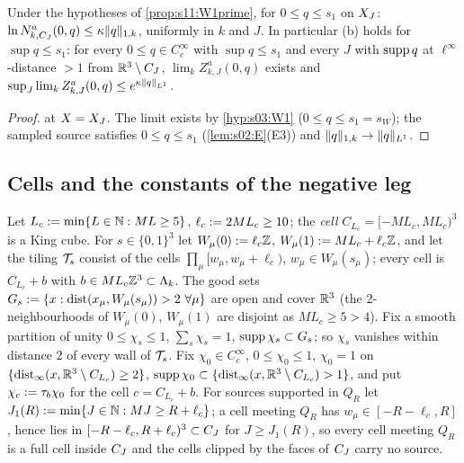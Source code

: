 \begin{corollary}\label{cor:s11:W2prime}
Under the hypotheses of \cref{prop:s11:W1prime}, for $0\le q\le s_1$ on $X_J$: $\ln N^a_{k,C_J}(0,q)\le\kappa\lVert q\rVert_{1,k}$, uniformly in $k$ and $J$. In particular \Wtwo(b) holds for $\sup q\le s_1$: for every $0\le q\in C^\infty_c$ with $\sup q\le s_1$ and every $J$ with $\operatorname{supp} q$ at $\ell^\infty$-distance $>1$ from $\mathbb R^3\setminus C_J$, $\lim_kZ^a_{k,J}(0,q)$ exists and $\sup_J\lim_kZ^a_{k,J}(0,q)\le e^{\kappa\lVert q\rVert_{L^1}}$.
\end{corollary}

\begin{proof}
 at $X=X_J$. The limit exists by \cref{hyp:s03:W1} ($0\le q\le s_1=s_W$); the sampled source satisfies $0\le q\le s_1$ (\cref{lem:s02:E}(E3)) and $\lVert q\rVert_{1,k}\to\lVert q\rVert_{L^1}$.
\end{proof}

\subsection{Cells and the constants of the negative leg}

\begin{definition}\label{def:s11:cells}
Let $L_c:=\min\{L\in\mathbb N:ML\ge5\}$, $\ell_c:=2ML_c\ge10$; the \emph{cell} $C_{L_c}=[-ML_c,ML_c)^3$ is a King cube. For $s\in\{0,1\}^3$ let $W_\mu(0):=\ell_c\mathbb Z$, $W_\mu(1):= ML_c+\ell_c\mathbb Z$, and let the tiling $\mathcal T_s$ consist of the cells $\prod_\mu[w_\mu,w_\mu+\ell_c)$, $w_\mu\in W_\mu(s_\mu)$; every cell is $C_{L_c}+b$ with $b\in ML_c\mathbb Z^3\subset\Lambda_k$. The good sets $G_s\defeq\{x:\dist(x_\mu,W_\mu(s_\mu))>2\ \forall\mu\}$ are open and cover $\mathbb R^3$ (the $2$-neighbourhoods of $W_\mu(0)$, $W_\mu(1)$ are disjoint as $ML_c\ge5>4$). Fix a smooth partition of unity $0\le\chi_s\le1$, $\sum_s\chi_s=1$, $\operatorname{supp}\chi_s\subset G_s$; so $\chi_s$ vanishes within distance $2$ of every wall of $\mathcal T_s$. Fix $\chi_0\in C^\infty_c$, $0\le\chi_0\le1$, $\chi_0=1$ on $\{\operatorname{dist}_\infty(x,\mathbb R^3\setminus C_{L_c})\ge2\}$, $\operatorname{supp}\chi_0\subset\{\operatorname{dist}_\infty(x,\mathbb R^3\setminus C_{L_c})>1\}$, and put $\chi_c:=\tau_b\chi_0$ for the cell $c=C_{L_c}+b$. For sources supported in $Q_R$ let $J_1(R):=\min\{J\in\mathbb N:MJ\ge R+\ell_c\}$; a cell meeting $Q_R$ has $w_\mu\in[-R-\ell_c,R]$, hence lies in $[-R-\ell_c,R+\ell_c)^3\subset C_J$ for $J\ge J_1(R)$, so every cell meeting $Q_R$ is a full cell inside $C_J$ and the cells clipped by the faces of $C_J$ carry no source.
\end{definition}

